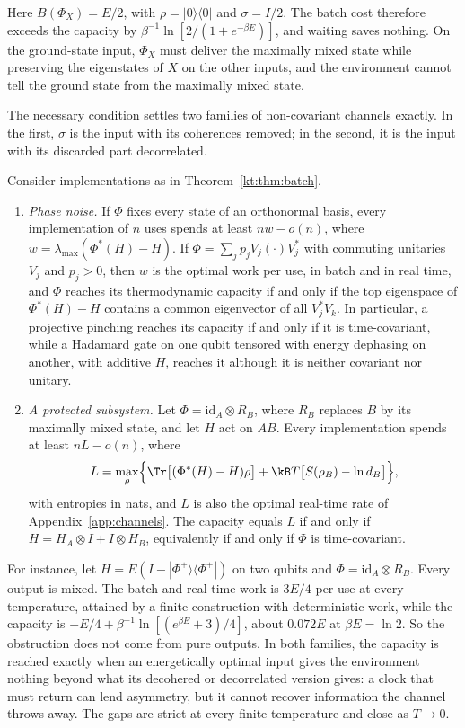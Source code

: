 Here $B(\Phi_X)=E/2$, with $\rho=|0\rangle\langle0|$ and $\sigma=I/2$. The batch cost therefore exceeds the capacity by $\beta^{-1}\ln[2/(1+e^{-\beta E})]$, and waiting saves nothing. On the ground-state input, $\Phi_X$ must deliver the maximally mixed state while preserving the eigenstates of $X$ on the other inputs, and the environment cannot tell the ground state from the maximally mixed state.

The necessary condition settles two families of non-covariant channels exactly. In the first, $\sigma$ is the input with its coherences removed; in the second, it is the input with its discarded part decorrelated.

\begin{proposition}\label{kt:prop:families}
Consider implementations as in Theorem~\ref{kt:thm:batch}.
\begin{enumerate}[label=(\alph*)]
\item \emph{Phase noise.} If $\Phi$ fixes every state of an orthonormal basis, every implementation of $n$ uses spends at least $nw-o(n)$, where $w=\lambda_{\max}(\Phi^*(H)-H)$. If $\Phi=\sum_jp_jV_j(\cdot)V_j^*$ with commuting unitaries $V_j$ and $p_j>0$, then $w$ is the optimal work per use, in batch and in real time, and $\Phi$ reaches its thermodynamic capacity if and only if the top eigenspace of $\Phi^*(H)-H$ contains a common eigenvector of all $V_j^*V_k$. In particular, a projective pinching reaches its capacity if and only if it is time-covariant, while a Hadamard gate on one qubit tensored with energy dephasing on another, with additive $H$, reaches it although it is neither covariant nor unitary.
\item \emph{A protected subsystem.} Let $\Phi=\mathrm{id}_A\otimes R_B$, where $R_B$ replaces $B$ by its maximally mixed state, and let $H$ act on $AB$. Every implementation spends at least $nL-o(n)$, where
\[
L=\max_\rho\Bigl\{\Tr\bigl[(\Phi^*(H)-H)\rho\bigr]+\kB T\bigl[S(\rho_B)-\ln d_B\bigr]\Bigr\},
\]
with entropies in nats, and $L$ is also the optimal real-time rate of Appendix~\ref{app:channels}. The capacity equals $L$ if and only if $H=H_A\otimes I+I\otimes H_B$, equivalently if and only if $\Phi$ is time-covariant.
\end{enumerate}
\end{proposition}

For instance, let $H=E(I-|\Phi^+\rangle\langle\Phi^+|)$ on two qubits and $\Phi=\mathrm{id}_A\otimes R_B$. Every output is mixed. The batch and real-time work is $3E/4$ per use at every temperature, attained by a finite construction with deterministic work, while the capacity is $-E/4+\beta^{-1}\ln[(e^{\beta E}+3)/4]$, about $0.072E$ at $\beta E=\ln2$. So the obstruction does not come from pure outputs. In both families, the capacity is reached exactly when an energetically optimal input gives the environment nothing beyond what its decohered or decorrelated version gives: a clock that must return can lend asymmetry, but it cannot recover information the channel throws away. The gaps are strict at every finite temperature and close as $T\to0$.

